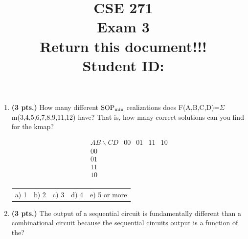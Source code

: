 \documentclass{article}
\begin{document}
\newcommand{\SOPmin}{${\rm SOP}_{\rm min} \ $}
\newcommand{\POSmin}{${\rm POS}_{\rm min} \ $}
\newcommand{\bs}{\backslash}
\newcommand{\x}{\addtocounter{enumi}{1} \theenumi}


\title{
\Huge{CSE 271}\\
\normalsize{Exam 3}\\
\normalsize{Return this document!!!}\\
Student ID:}
\date{}

\maketitle{}

\begin{enumerate}
\item {\bf (3 pts.)} How many different \SOPmin realizations does 
F(A,B,C,D)=$\Sigma$m(3,4,5,6,7,8,9,11,12) have?  That is, how many correct
solutions can you find for the kmap?

$$ \begin{array} {c||c|c|c|c}
        AB \bs CD & 00 & 01 & 11 & 10 \\ \hline \hline
        00        &    &    &    &    \\ \hline
        01        &    &    &    &    \\ \hline
        11        &    &    &    &    \\ \hline
        10        &    &    &    &    \\
\end{array} $$ 

\begin{tabular}{p{0.75in}p{0.75in}p{0.75in}p{0.75in}p{0.75in}}
a) 1 & b) 2 & c) 3 & d) 4 & e) 5 or more \\
\end{tabular}

\item {\bf (3 pts.)} The output of a sequential circuit is fundamentally
different than a combinational circuit because the sequential circuits 
output is a function of the?


\end{enumerate}
\end{document}

